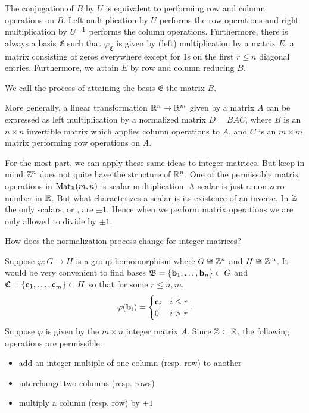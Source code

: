 \documentclass[../algebraNotesMSRI-UP2016.tex]{subfiles}
\begin{document}
\begin{frame}
The conjugation of $B$ by $U$ is equivalent to performing row and column operations on $B$.  Left multiplication by $U$ performs the row operations and right multiplication by $U^{-1}$ performs the column operations.  Furthermore, there is always a %
basis $\mathfrak E$ such that $\varphi_{\mathfrak E}$ is given by (left) multiplication by a  matrix $E$, a matrix consisting of zeros everywhere except for 1s on the first $r\leq n$ diagonal entries.  Furthermore, we attain $E$ by row and column reducing $B$.

\smallGap
We call the process of attaining the basis $\mathfrak E$  the matrix $B$.
\end{frame}

\begin{frame}
More generally, a linear transformation $\mathbb R^n\to \mathbb R^m$ given by a matrix $A$ can be expressed as left multiplication by a normalized matrix $D=BAC$, where $B$ is an $n\times n$ invertible matrix which applies column operations to $A$, and $C$ is an $m\times m$ matrix performing row operations on $A$.

\smallGap
For the most part, we can apply these same ideas to integer matrices.  But keep in mind $\mathbb Z^n$ does not quite have the structure of $\mathbb R^n$.  One of the permissible matrix operations in $\operatorname{Mat}_{\mathbb R}(m,n)$ is scalar multiplication.  A scalar is just a non-zero number in $\mathbb R$.  But what characterizes a scalar is its existence of an inverse.  In $\mathbb Z$ the only scalars, or , are $\pm 1$.  Hence when we perform matrix operations we are only allowed to divide by $\pm 1$.

\smallGap
\begin{que}
How does the normalization process change for integer matrices?  
\end{que}
\end{frame}

\begin{frame}
Suppose $\varphi: G\to H$ is a group homomorphism where $G\cong \mathbb Z^n$ and $H\cong \mathbb Z^m$.  It would be very convenient to find bases $\mathfrak B=\{\mathbf b_1,\dots,\mathbf b_n\}\subset G$ and $\mathfrak C=\{\mathbf c_1,\dots,\mathbf c_m\}\subset H$ so that for some $r\leq n,m$,
\[
\varphi(\mathbf b_i)
	=\begin{cases}
		\mathbf c_i & i\leq r \\
		0 & i>r
	\end{cases}.
\]
Suppose $\varphi$ is given by the $m\times n$ integer matrix $A$.  Since $\mathbb Z\subset\mathbb R$, the following operations are permissible:
\begin{itemize}
\item add an integer multiple of one column (resp. row) to another
\item interchange two columns (resp. rows)
\item multiply a column (resp. row) by $\pm 1$
\end{itemize}  
\end{frame}
\end{document}
